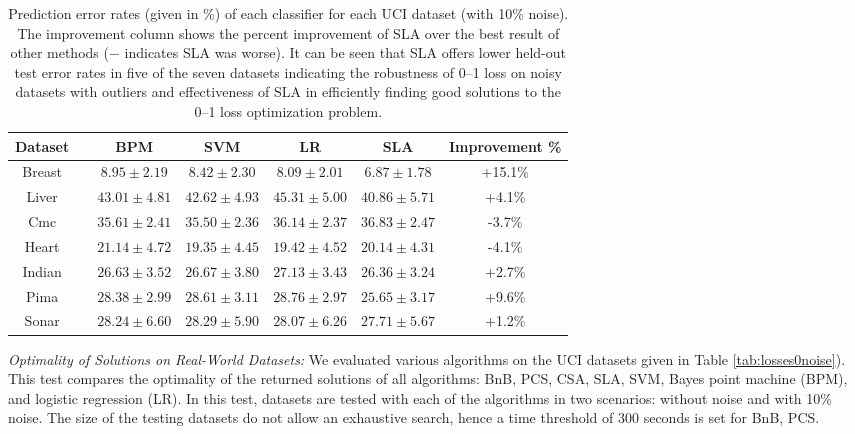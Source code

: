 \begin{table}[htbp!]
\centering
{\footnotesize 
\begin{tabular}{|cc|  ccc|c|c|}
\hline\hline
{\bf Dataset} && {\bf BPM} & {\bf SVM} & {\bf LR} & {\bf SLA} & {\bf Improvement \%}\\  
\hline
Breast && $8.95 \pm 2.19$ & $8.42 \pm 2.30$ & $8.09 \pm 2.01$ & $6.87 \pm 1.78$ & +15.1\%\\  
Liver && $43.01 \pm 4.81$ & $42.62 \pm 4.93$ & $45.31 \pm 5.00$ & $40.86 \pm 5.71$ & +4.1\%\\  
Cmc && $35.61 \pm 2.41$ & $35.50 \pm 2.36$ & $36.14 \pm 2.37$ & $36.83 \pm 2.47$ & -3.7\%\\  
Heart && $21.14 \pm 4.72$ & $19.35 \pm 4.45$ & $19.42 \pm 4.52$ & $20.14 \pm 4.31$ & -4.1\%\\  
Indian && $26.63 \pm 3.52$ & $26.67 \pm 3.80$ & $27.13 \pm 3.43$ & $26.36 \pm 3.24$ & +2.7\%\\  
Pima && $28.38 \pm 2.99$ & $28.61 \pm 3.11$ & $28.76 \pm 2.97$ & $25.65 \pm 3.17$ & +9.6\%\\  
Sonar && $28.24 \pm 6.60$ & $28.29 \pm 5.90$ & $28.07 \pm 6.26$ & $27.71 \pm 5.67$ & +1.2\%\\  
\hline
\end{tabular}}
\caption{Prediction error rates (given in \%) of each classifier for
  each UCI dataset (with 10\% noise). The improvement column shows the
  percent improvement of SLA over the best result of other methods ($-$
  indicates SLA was worse). It can be seen that SLA offers lower held-out
  test error rates in five of the seven datasets indicating the robustness
  of 0--1 loss on noisy datasets with outliers and effectiveness of SLA
  in efficiently finding good solutions to the 0--1 loss optimization problem.}
\label{tab:ucierrorrates}
\end{table}

\noindent\emph{Optimality of Solutions on Real-World Datasets:} We
evaluated various algorithms on the UCI datasets given in Table
\ref{tab:losses0noise}). This test compares the optimality of the returned
solutions of all algorithms: BnB, PCS, CSA, SLA, SVM, Bayes point
machine (BPM), and logistic regression (LR). In this test, datasets
are tested with each of the algorithms in two scenarios: without noise
and with 10\% noise.  The size of the testing datasets do not allow an
exhaustive search, hence a time threshold of 300 seconds is set for
BnB, PCS.  

